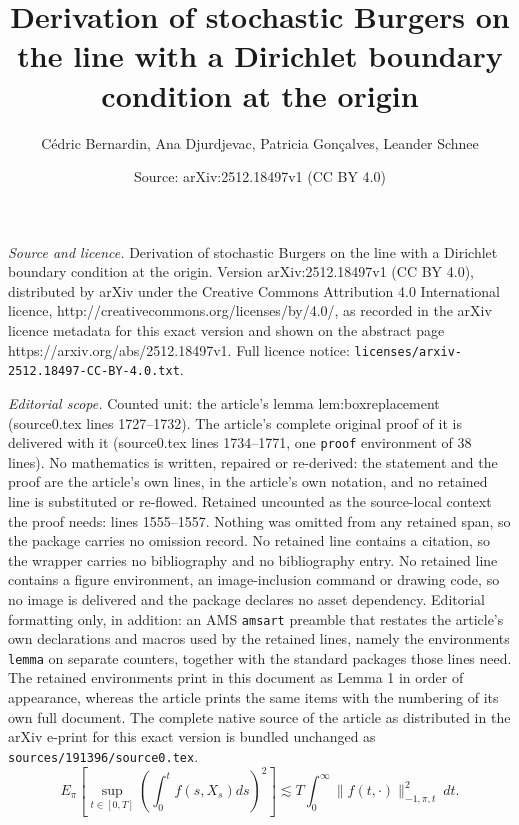 \documentclass[10pt,a4paper]{amsart}
\title{Derivation of stochastic Burgers on the line with a Dirichlet boundary condition at the origin}
\author{C\'edric Bernardin, Ana Djurdjevac, Patricia Gon\c{c}alves, Leander Schnee}
\date{Source: arXiv:2512.18497v1 (CC BY 4.0)}
\begin{document}
\maketitle

\noindent\emph{Source and licence.} Derivation of stochastic Burgers on the line with a Dirichlet boundary condition at the origin. Version arXiv:2512.18497v1 (CC BY 4.0), distributed by arXiv under the Creative Commons Attribution 4.0 International licence, http://creativecommons.org/licenses/by/4.0/, as recorded in the arXiv licence metadata for this exact version and shown on the abstract page https://arxiv.org/abs/2512.18497v1. Full licence notice: \texttt{licenses/arxiv-2512.18497-CC-BY-4.0.txt}.\par\smallskip

\noindent\textit{Editorial scope.} Counted unit: the article's lemma lem:boxreplacement (source0.tex lines 1727--1732). The article's complete original proof of it is delivered with it (source0.tex lines 1734--1771, one \texttt{proof} environment of 38 lines). No mathematics is written, repaired or re-derived: the statement and the proof are the article's own lines, in the article's own notation, and no retained line is substituted or re-flowed.  Retained uncounted as the source-local context the proof needs: lines 1555--1557.  Nothing was omitted from any retained span, so the package carries no omission record.  No retained line contains a citation, so the wrapper carries no bibliography and no bibliography entry.  No retained line contains a figure environment, an image-inclusion command or drawing code, so no image is delivered and the package declares no asset dependency.  Editorial formatting only, in addition: an AMS \texttt{amsart} preamble that restates the article's own declarations and macros used by the retained lines, namely the environments \texttt{lemma} on separate counters, together with the standard packages those lines need.  The retained environments print in this document as Lemma 1 in order of appearance, whereas the article prints the same items with the numbering of its own full document.  The complete native source of the article as distributed in the arXiv e-print for this exact version is bundled unchanged as \texttt{sources/191396/source0.tex}.
\begin{equation}\label{eq:inhomvariance} 
 E_{\pi}\left[ \sup_{t\in[0,T]} \left( \int_0^t f(s,X_s) ds \right)^2 \right] \lesssim T\int_0^{\infty}\|f(t,\cdot)\|^2_{-1,\pi,t}\  dt.
\end{equation}
\end{document}
